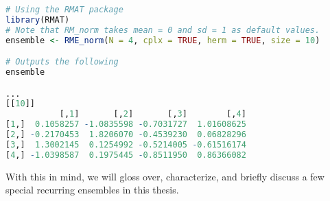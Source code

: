 \begin{lstlisting}[language=R]
# Using the RMAT package
library(RMAT)
# Note that RM_norm takes mean = 0 and sd = 1 as default values.
ensemble <- RME_norm(N = 4, cplx = TRUE, herm = TRUE, size = 10)

# Outputs the following
ensemble

...
[[10]]
           [,1]       [,2]       [,3]        [,4]
[1,]  0.1058257 -1.0835598 -0.7031727  1.01608625
[2,] -0.2170453  1.8206070 -0.4539230  0.06828296
[3,]  1.3002145  0.1254992 -0.5214005 -0.61516174
[4,] -1.0398587  0.1975445 -0.8511950  0.86366082
\end{lstlisting}

With this in mind, we will gloss over, characterize, and briefly discuss a few special recurring ensembles in this thesis.

